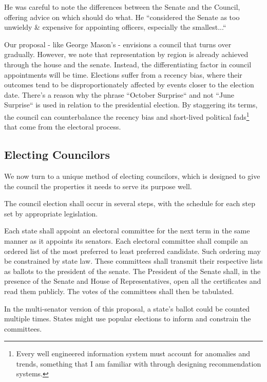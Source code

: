 \documentclass{article}
\begin{document}
He was careful to note the differences between the Senate and the Council, offering advice on which should do what. He “considered the Senate as too unwieldy \& expensive for appointing officers, especially the smallest...“

Our proposal - like George Mason's - envisions a council that turns over gradually. However, we note that representation by region is already achieved through the house and the senate. Instead, the differentiating factor in council appointments will be time. Elections suffer from a recency bias, where their outcomes tend to be disproportionately affected by events closer to the election date. There's a reason why the phrase “October Surprise“ and not “June Surprise“ is used in relation to the presidential election. By staggering its terms, the council can counterbalance the recency bias and short-lived political fads\footnote{Every well engineered information system must account for anomalies and trends, something that I am familiar with through designing recommendation systems.\cite{Yang}} that come from the electoral process.

\subsection{Electing Councilors}

We now turn to a unique method of electing councilors, which is designed to give the council the properties it needs to serve its purpose well.

\begin{quoting}
The council election shall occur in several steps, with the schedule for each step set by appropriate legislation.

Each state shall appoint an electoral committee for the next term in the same manner as it appoints its senators. Each electoral committee shall compile an ordered list of the most preferred to least preferred candidate. Such ordering may be constrained by state law. These committees shall transmit their respective lists as ballots to the president of the senate.  The President of the Senate shall, in the presence of the Senate and House of Representatives, open all the certificates and read them publicly. The votes of the committees shall then be tabulated.
\end{quoting}

In the multi-senator version of this proposal, a state's ballot could be counted multiple times. States might use popular elections to inform and constrain the committees.
\end{document}
